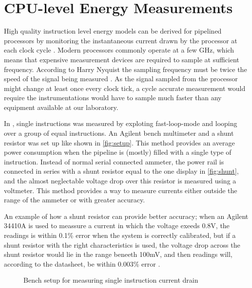 \section{CPU-level Energy Measurements}

High quality instruction level energy models can be derived for pipelined
processors by monitoring the instantaneous current drawn by the processor at
each clock cycle \cite{nikolaidis2005instruction}. Modern processors commonly
operate at a few GHz, which means that expensive measurement devices are
required to sample at sufficient frequency. According to Harry Nyquist the
sampling frequency must be twice the speed of the signal being measured
\cite{nyquist1928certain}. As the signal sampled from the processor might
change at least once every clock tick, a cycle accurate measurement would
require the instrumentations would have to sample much faster than any equipment
available at our laboratory.

In \cite{rundehvatum2013exploring}, single instructions was measured by
exploting fast-loop-mode and looping over a group of equal instructions. An
Agilent bench multimeter and a shunt resistor was set up like shown in
\autoref{fig:setup}. This method provides an average power consumption when the
pipeline is (mostly) filled with a single type of instruction. Instead of normal
serial connected ammeter, the power rail is connected in series with a shunt
resistor equal to the one display in \autoref{fig:shunt}, and the almost
neglectable voltage drop over this resistor is measured using a voltmeter. This
method provides a way to measure currents either outside the range of the ammeter or with
greater accuracy.

An example of how a shunt resistor can provide better accuracy; when an Agilent
34410A is used to meassure a current in which the voltage exeeds 0.8V, the
readings is within 0.1\% error when the system is correctly calibrated, but if a
shunt resistor with the right characteristics is used, the voltage drop across
the shunt resistor would lie in the range beneeth 100mV, and then readings will,
according to the datasheet, be within 0.003\% error \cite{agilent34410a}.

\begin{figure}
    \centering
    
    \caption{Bench setup for measuring single instruction current drain}
    \label{fig:setup}
\end{figure}

